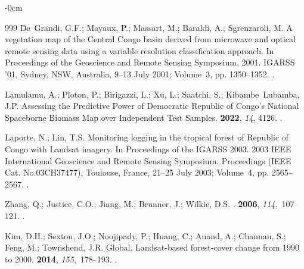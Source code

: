 \documentclass[applsci,article,accept,pdftex,moreauthors]{Definitions/mdpi}
\begin{document}
\begin{adjustwidth}{-\extralength}{0cm}
\begin{thebibliography}{999}
De~Grandi, G.F.; Mayaux, P.; Massart, M.; Baraldi, A.; Sgrenzaroli, M.
\newblock A vegetation map of the Central Congo basin derived from microwave
  and optical remote sensing data using a variable resolution classification
  approach.
\newblock In Proceedings of the Geoscience and Remote Sensing Symposium, 2001. IGARSS '01, Sydney, NSW, Australia, 9--13 July 2001; %
 Volume~3, pp. 1350--1352.
.

Lamulamu, A.; Ploton, P.; Birigazzi, L.; Xu, L.; Saatchi, S.; Kibambe~Lubamba,
  J.P.
\newblock Assessing the Predictive Power of Democratic Republic of Congo's
  National Spaceborne Biomass Map over Independent Test Samples.
 {\bf 2022}, {\em 14}, 4126.
.

Laporte, N.; Lin, T.S.
\newblock Monitoring logging in the tropical forest of Republic of Congo with
  Landsat imagery.
\newblock In Proceedings of the {IGARSS 2003. 2003 IEEE International
  Geoscience and Remote Sensing Symposium. Proceedings (IEEE Cat.
  No.03CH37477)}, Toulouse, France, 21--25 July 2003; %
 Volume~4, pp. 2565--2567.
.

Zhang, Q.; Justice, C.O.; Jiang, M.; Brunner, J.; Wilkie, D.S.
.
 {\bf 2006}, {\em
  114},~107--121.
.

Kim, D.H.; Sexton, J.O.; Noojipady, P.; Huang, C.; Anand, A.; Channan, S.;
  Feng, M.; Townshend, J.R.
\newblock Global, Landsat-based forest-cover change from 1990 to 2000.
 {\bf 2014}, {\em 155},~178--193.
.


\end{thebibliography}
\end{adjustwidth}
\end{document}
